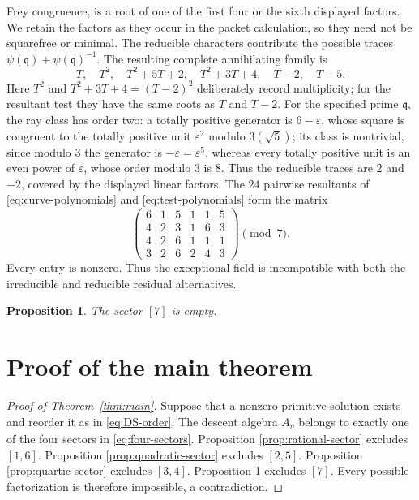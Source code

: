 \documentclass[11pt]{article}
\newtheorem{proposition}[theorem]{Proposition}
\theoremstyle{definition}
\theoremstyle{remark}
\begin{document}
Frey congruence, is a root of
one of the first four or the sixth displayed factors.  We retain the factors as they
occur in the packet calculation, so they need not be squarefree or minimal.
The reducible characters contribute the possible traces
$\psi(\mathfrak q)+\psi(\mathfrak q)^{-1}$.  The resulting complete
annihilating family is
\begin{equation}\label{eq:test-polynomials}
 T,\quad T^2,\quad T^2+5T+2,\quad T^2+3T+4,\quad T-2,\quad T-5.
\end{equation}
Here $T^2$ and $T^2+3T+4=(T-2)^2$ deliberately record multiplicity; for
the resultant test they have the same roots as $T$ and $T-2$.  For the specified prime $\mathfrak q$, the ray class has order two:
a totally positive generator is $6-\varepsilon$, whose square is
congruent to the totally positive unit $\varepsilon^2$ modulo
$3(\sqrt5)$; its class is nontrivial, since modulo $3$ the generator is
$-\varepsilon=\varepsilon^5$, whereas every totally positive unit is an
even power of $\varepsilon$, whose order modulo $3$ is $8$.
Thus the reducible traces are
$2$ and $-2$, covered by the displayed linear factors.  The
$24$ pairwise resultants of \eqref{eq:curve-polynomials} and
\eqref{eq:test-polynomials} form the matrix
\begin{equation}\label{eq:resultants}
 \begin{pmatrix}
 6&1&5&1&1&5\\
 4&2&3&1&6&3\\
 4&2&6&1&1&1\\
 3&2&6&2&4&3
 \end{pmatrix}\pmod7.
\end{equation}
Every entry is nonzero.  Thus the exceptional field is incompatible with
both the irreducible and reducible residual alternatives.

\begin{proposition}\label{prop:septic-sector}
The sector $[7]$ is empty.
\end{proposition}

\section{Proof of the main theorem}

\begin{proof}[Proof of Theorem~\ref{thm:main}]
Suppose that a nonzero primitive solution exists and reorder it as in
\eqref{eq:DS-order}.  The descent algebra $A_\eta$ belongs to exactly one
of the four sectors in \eqref{eq:four-sectors}.  Proposition
\ref{prop:rational-sector} excludes $[1,6]$.  Proposition
\ref{prop:quadratic-sector} excludes $[2,5]$.  Proposition
\ref{prop:quartic-sector} excludes $[3,4]$.  Proposition
\ref{prop:septic-sector} excludes $[7]$.  Every possible factorization is
therefore impossible, a contradiction.
\end{proof}
\end{document}
